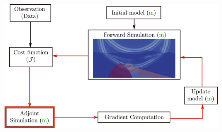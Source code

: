 \begin{frame}[noframenumbering]
\begin{figure}
  \includegraphics[scale=0.31]{image/fwi_workflow_red2.pdf}
\end{figure}
\end{frame}
